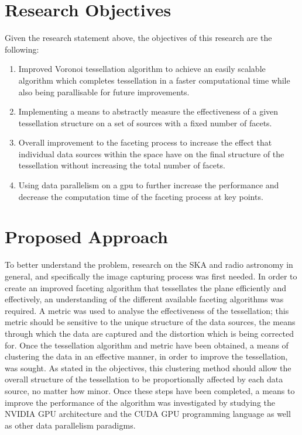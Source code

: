 \section{Research Objectives}
Given the research statement above, the objectives of this research are the following:
\begin{enumerate}
\item Improved Voronoi tessellation algorithm to achieve an easily scalable algorithm which completes tessellation in a faster computational time while also being parallisable for future improvements.
\item Implementing a means to abstractly measure the effectiveness of a given tessellation structure on a set of sources with a fixed number of facets.
\item Overall improvement to the faceting process to increase the effect that individual data sources within the space have on the final structure of the tessellation without increasing the total number of facets.
\item Using data parallelism on a \gls{gpu} to further increase the performance and decrease the computation time of the faceting process at key points.
\end{enumerate}
\section{Proposed Approach}
To better understand the problem, research on the SKA and radio astronomy in general, and specifically the image capturing process was first needed. In order to create an improved faceting algorithm that tessellates the plane efficiently and effectively, an understanding of the different available faceting algorithms was required. A metric was used to analyse the effectiveness of the tessellation; this metric should be sensitive to the unique structure of the data sources, the means through which the data are captured and the distortion which is being corrected for. Once the tessellation algorithm and metric have been obtained, a means of clustering the data in an effective manner, in order to improve the tessellation, was sought. As stated in the objectives, this clustering method should allow the overall structure of the tessellation to be proportionally affected by each data source, no matter how minor. Once these steps have been completed, a means to improve the performance of the algorithm was investigated by studying the NVIDIA GPU architecture and the CUDA GPU programming language as well as other data parallelism paradigms.

